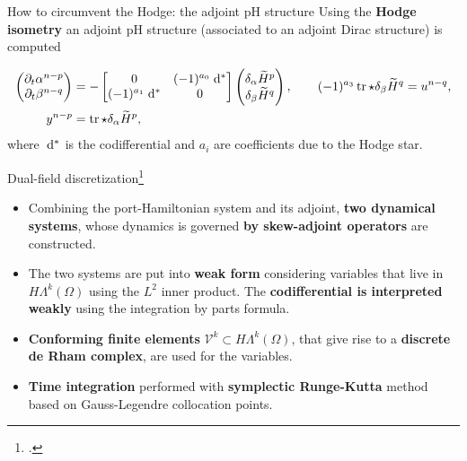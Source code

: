 \documentclass[aspectratio=169]{beamer}
\DeclareMathOperator{\tr}{tr}
\begin{document}
	
	\begin{frame}{How to circumvent the Hodge: the adjoint pH structure}
		Using the \textbf{Hodge isometry} an adjoint pH structure (associated to an adjoint Dirac structure) is computed
		
		\begin{tcolorbox}[nobeforeafter, colframe=theme,title=Adjoint pH system]%
			\begin{equation*}
				\begin{aligned}
					\begin{pmatrix}
						\partial_t {\alpha}^{n-p} \\
						\partial_t {\beta}^{n-q} \\
					\end{pmatrix} &= -
					\begin{bmatrix}
						0 &  (-1)^{a_0}\d{}^* \\
						(-1)^{a_1}\d{}^* & 0 \\
					\end{bmatrix}
					\begin{pmatrix}
						\delta_{\alpha} \widetilde{H}^p \\
						\delta_{{\beta}} \widetilde{H}^q
					\end{pmatrix}, \qquad (-1)^{a_3}\tr \star \delta_{{\beta}} \widetilde{H}^q= u^{n-q}, \\
					y^{n-p} &= \tr \star \delta_{\alpha} \widetilde{H}^p,
				\end{aligned}
			\end{equation*}
			where $\d{}^{*}$ is the codifferential and $a_i$ are coefficients due to the Hodge star.
		\end{tcolorbox} 
		
	\end{frame}
	
	\begin{frame}{Dual-field discretization\footcite{brugnoli2022df}}
		\begin{itemize}
			\item Combining the port-Hamiltonian system and its adjoint, \textbf{two dynamical systems}, whose dynamics is governed \textbf{by skew-adjoint operators} are constructed.
			\item The two systems are put into \textbf{weak form} considering variables that live in $H\Lambda^k(\Omega)$ using the $L^2$ inner product. The \textbf{codifferential is interpreted weakly} using the integration by parts formula.
			\item \textbf{Conforming finite elements} $\mathcal{V}^k \subset H\Lambda^k(\Omega)$, that give rise to a \textbf{discrete de Rham complex}, are used for the variables.
			\item \textbf{Time integration} performed with \textbf{symplectic Runge-Kutta} method based on Gauss-Legendre collocation points.
		\end{itemize}
		
	\end{frame}
	
\end{document}
